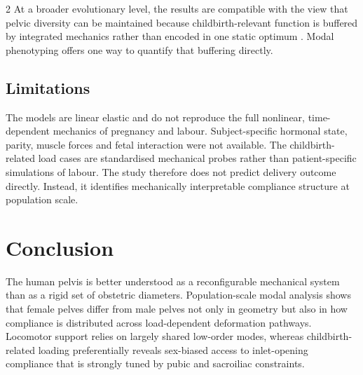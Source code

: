 \documentclass[openacc]{rsproca_new}
\begin{document}
\begin{multicols}{2}
At a broader evolutionary level, the results are compatible with the view that pelvic diversity can be maintained because childbirth-relevant function is buffered by integrated mechanics rather than encoded in one static optimum \cite{BettiManica2018,Novak2020,Pavlicev2020}. Modal phenotyping offers one way to quantify that buffering directly.

\subsection{Limitations}

The models are linear elastic and do not reproduce the full nonlinear, time-dependent mechanics of pregnancy and labour. Subject-specific hormonal state, parity, muscle forces and fetal interaction were not available. The childbirth-related load cases are standardised mechanical probes rather than patient-specific simulations of labour. The study therefore does not predict delivery outcome directly. Instead, it identifies mechanically interpretable compliance structure at population scale.

\section{Conclusion}

The human pelvis is better understood as a reconfigurable mechanical system than as a rigid set of obstetric diameters. Population-scale modal analysis shows that female pelves differ from male pelves not only in geometry but also in how compliance is distributed across load-dependent deformation pathways. Locomotor support relies on largely shared low-order modes, whereas childbirth-related loading preferentially reveals sex-biased access to inlet-opening compliance that is strongly tuned by pubic and sacroiliac constraints.

\end{multicols}

\enlargethispage{10pt}







\printbibliography
\end{document}
